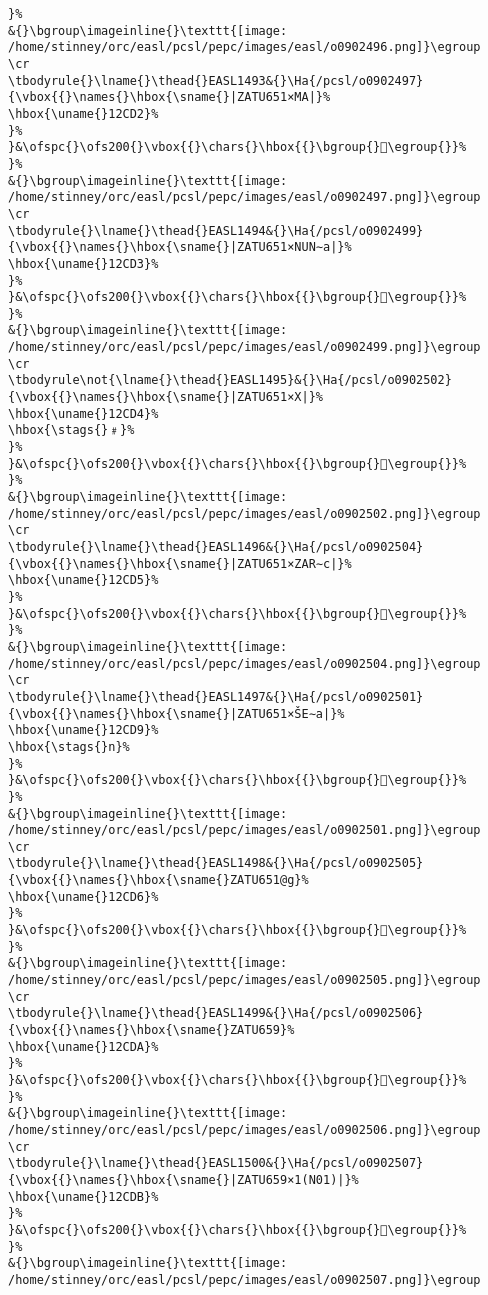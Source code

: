\begin{verbatim}
}%
&{}\bgroup\imageinline{}\texttt{[image: /home/stinney/orc/easl/pcsl/pepc/images/easl/o0902496.png]}\egroup
\cr
\tbodyrule{}\lname{}\thead{}EASL1493&{}\Ha{/pcsl/o0902497}{\vbox{{}\names{}\hbox{\sname{}|ZATU651×MA|}%
\hbox{\uname{}12CD2}%
}%
}&\ofspc{}\ofs200{}\vbox{{}\chars{}\hbox{{}\bgroup{}𒳒\egroup{}}%
}%
&{}\bgroup\imageinline{}\texttt{[image: /home/stinney/orc/easl/pcsl/pepc/images/easl/o0902497.png]}\egroup
\cr
\tbodyrule{}\lname{}\thead{}EASL1494&{}\Ha{/pcsl/o0902499}{\vbox{{}\names{}\hbox{\sname{}|ZATU651×NUN∼a|}%
\hbox{\uname{}12CD3}%
}%
}&\ofspc{}\ofs200{}\vbox{{}\chars{}\hbox{{}\bgroup{}𒳓\egroup{}}%
}%
&{}\bgroup\imageinline{}\texttt{[image: /home/stinney/orc/easl/pcsl/pepc/images/easl/o0902499.png]}\egroup
\cr
\tbodyrule\not{\lname{}\thead{}EASL1495}&{}\Ha{/pcsl/o0902502}{\vbox{{}\names{}\hbox{\sname{}|ZATU651×X|}%
\hbox{\uname{}12CD4}%
\hbox{\stags{}﹟}%
}%
}&\ofspc{}\ofs200{}\vbox{{}\chars{}\hbox{{}\bgroup{}𒳔\egroup{}}%
}%
&{}\bgroup\imageinline{}\texttt{[image: /home/stinney/orc/easl/pcsl/pepc/images/easl/o0902502.png]}\egroup
\cr
\tbodyrule{}\lname{}\thead{}EASL1496&{}\Ha{/pcsl/o0902504}{\vbox{{}\names{}\hbox{\sname{}|ZATU651×ZAR∼c|}%
\hbox{\uname{}12CD5}%
}%
}&\ofspc{}\ofs200{}\vbox{{}\chars{}\hbox{{}\bgroup{}𒳕\egroup{}}%
}%
&{}\bgroup\imageinline{}\texttt{[image: /home/stinney/orc/easl/pcsl/pepc/images/easl/o0902504.png]}\egroup
\cr
\tbodyrule{}\lname{}\thead{}EASL1497&{}\Ha{/pcsl/o0902501}{\vbox{{}\names{}\hbox{\sname{}|ZATU651×ŠE∼a|}%
\hbox{\uname{}12CD9}%
\hbox{\stags{}n}%
}%
}&\ofspc{}\ofs200{}\vbox{{}\chars{}\hbox{{}\bgroup{}𒳙\egroup{}}%
}%
&{}\bgroup\imageinline{}\texttt{[image: /home/stinney/orc/easl/pcsl/pepc/images/easl/o0902501.png]}\egroup
\cr
\tbodyrule{}\lname{}\thead{}EASL1498&{}\Ha{/pcsl/o0902505}{\vbox{{}\names{}\hbox{\sname{}ZATU651@g}%
\hbox{\uname{}12CD6}%
}%
}&\ofspc{}\ofs200{}\vbox{{}\chars{}\hbox{{}\bgroup{}𒳖\egroup{}}%
}%
&{}\bgroup\imageinline{}\texttt{[image: /home/stinney/orc/easl/pcsl/pepc/images/easl/o0902505.png]}\egroup
\cr
\tbodyrule{}\lname{}\thead{}EASL1499&{}\Ha{/pcsl/o0902506}{\vbox{{}\names{}\hbox{\sname{}ZATU659}%
\hbox{\uname{}12CDA}%
}%
}&\ofspc{}\ofs200{}\vbox{{}\chars{}\hbox{{}\bgroup{}𒳚\egroup{}}%
}%
&{}\bgroup\imageinline{}\texttt{[image: /home/stinney/orc/easl/pcsl/pepc/images/easl/o0902506.png]}\egroup
\cr
\tbodyrule{}\lname{}\thead{}EASL1500&{}\Ha{/pcsl/o0902507}{\vbox{{}\names{}\hbox{\sname{}|ZATU659×1(N01)|}%
\hbox{\uname{}12CDB}%
}%
}&\ofspc{}\ofs200{}\vbox{{}\chars{}\hbox{{}\bgroup{}𒳛\egroup{}}%
}%
&{}\bgroup\imageinline{}\texttt{[image: /home/stinney/orc/easl/pcsl/pepc/images/easl/o0902507.png]}\egroup

\end{verbatim}
